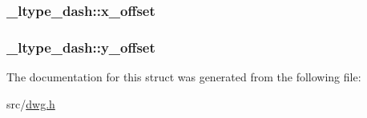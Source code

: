 \hypertarget{struct__ltype__dash_a1ff0ff9780ecb460e5b318ff76859214}{
\subsubsection[{x\-\_\-offset}]{ {\bf \-\_\-ltype\-\_\-dash\-::x\-\_\-offset}}}\label{struct__ltype__dash_a1ff0ff9780ecb460e5b318ff76859214}
\hypertarget{struct__ltype__dash_ad82e83273fb4db849f4543ece57d719b}{
\subsubsection[{y\-\_\-offset}]{ {\bf \-\_\-ltype\-\_\-dash\-::y\-\_\-offset}}}\label{struct__ltype__dash_ad82e83273fb4db849f4543ece57d719b}


\-The documentation for this struct was generated from the following file\-:\begin{DoxyCompactItemize}
\item 
src/\hyperlink{dwg_8h}{dwg.\-h}\end{DoxyCompactItemize}
